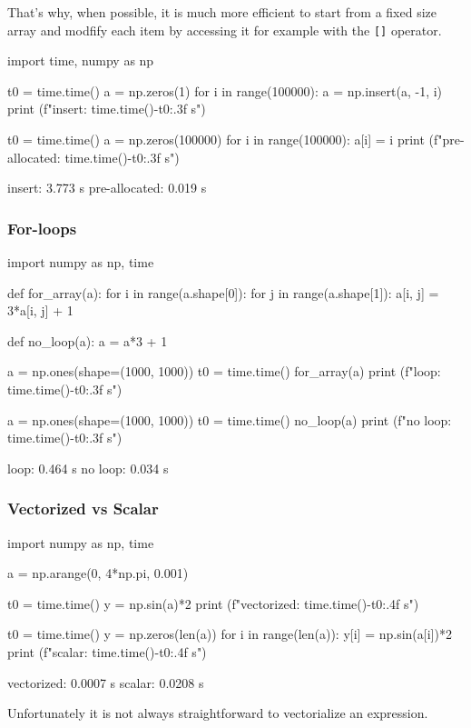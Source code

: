 That's why, when possible, it is much more efficient to start from a fixed size array and modfify each item by accessing it for example with the \texttt{[]} operator.

\begin{ipythonnon}
import time, numpy as np

t0 = time.time()
a = np.zeros(1)
for i in range(100000):
  a = np.insert(a, -1, i)
print (f"insert: {time.time()-t0:.3f} s")

t0 = time.time()
a = np.zeros(100000)
for i in range(100000):
  a[i] = i
print (f"pre-allocated: {time.time()-t0:.3f} s")
\end{ipythonnon}
\begin{ioutput}
insert: 3.773 s
pre-allocated: 0.019 s
\end{ioutput}

\subsubsection{For-loops}

\begin{ipythonnon}
import numpy as np, time

def for_array(a):
  for i in range(a.shape[0]):
    for j in range(a.shape[1]):
      a[i, j] = 3*a[i, j] + 1

def no_loop(a):
  a = a*3 + 1

a = np.ones(shape=(1000, 1000))
t0 = time.time()
for_array(a)
print (f"loop: {time.time()-t0:.3f} s")

a = np.ones(shape=(1000, 1000))
t0 = time.time()
no_loop(a)
print (f"no loop: {time.time()-t0:.3f} s")
\end{ipythonnon}
\begin{ioutput}
loop: 0.464 s
no loop: 0.034 s
\end{ioutput}

\subsubsection{Vectorized vs Scalar}

\begin{ipythonnon}
import numpy as np, time

a = np.arange(0, 4*np.pi, 0.001) 

t0 = time.time()
y = np.sin(a)*2 
print (f"vectorized: {time.time()-t0:.4f} s")

t0 = time.time()
y = np.zeros(len(a))
for i in range(len(a)):
  y[i] = np.sin(a[i])*2
print (f"scalar: {time.time()-t0:.4f} s")
\end{ipythonnon}
\begin{ioutput}
vectorized: 0.0007 s
scalar: 0.0208 s
\end{ioutput}
Unfortunately it is not always straightforward to vectorialize an expression.

